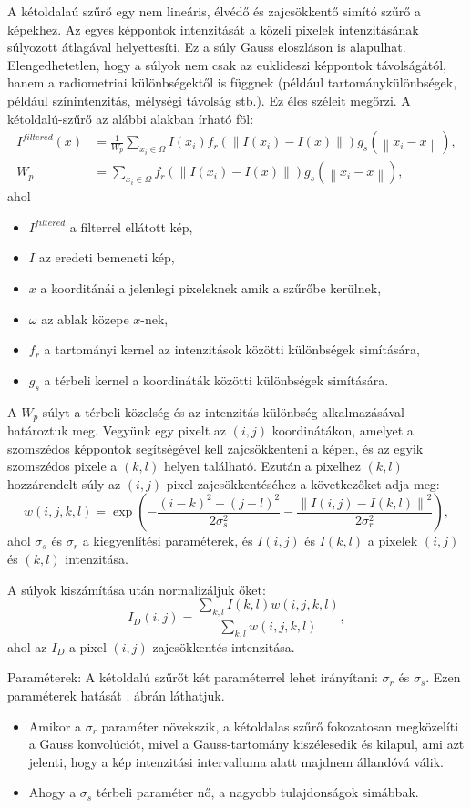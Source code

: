 
A kétoldalaú szűrő egy nem lineáris, élvédő és zajcsökkentő simító szűrő a képekhez. Az egyes képpontok intenzitását a közeli pixelek intenzitásának súlyozott átlagával helyettesíti. Ez a súly Gauss eloszláson is  alapulhat. Elengedhetetlen, hogy a súlyok nem csak az euklideszi képpontok távolságától, hanem a radiometriai különbségektől is függnek (például tartománykülönbségek, például színintenzitás, mélységi távolság stb.). Ez éles széleit megőrzi. A kétoldalú-szűrő az alábbi alakban írható föl:
\begin{align*}
I^{filtered}(x) &=
\frac{1}{W_p}\sum_{x_i\in\Omega}{I(x_i)f_r(\left \| I(x_i)-I(x) \right \|)g_s(\left \| x_i-x \right \|)}, \\
W_p &=
\sum_{x_i \in \Omega} f_r(\left \| I(x_i)-I(x) \right \|)g_s(\left \| x_i-x \right \|),
\end{align*}
ahol
\begin{itemize}
\item $I^{filtered}$ a filterrel ellátott kép,
\item $I$ az eredeti bemeneti kép,
\item $x$ a koorditánái a jelenlegi pixeleknek amik a szűrőbe kerülnek,
\item $\omega$ az ablak közepe $x$-nek,
\item $f_r$ a tartományi kernel az intenzitások közötti különbségek simítására,
\item $g_s$ a térbeli kernel a koordináták közötti különbségek simítására.
\end{itemize}
A $W_p$ súlyt a térbeli közelség és az intenzitás különbség alkalmazásával határoztuk meg. Vegyünk egy pixelt az $(i, j)$ koordinátákon, amelyet a szomszédos képpontok segítségével kell zajcsökkenteni a képen, és az egyik szomszédos pixele a $(k, l)$ helyen található. Ezután a pixelhez $(k, l)$ hozzárendelt súly az $(i, j)$ pixel zajcsökkentéséhez a következőket adja meg:
$$
w(i, j, k, l) =
\exp \left(
-\frac{(i-k)^{2}+(j-l)^{2}}{2\sigma_{s}^{2}}
-\frac{\left \| I(i,j)-I(k,l) \right \|^{2}}{2\sigma_{r}^{2}}
\right),
$$
ahol $\sigma_s$ és $\sigma_r$ a kiegyenlítési paraméterek, és $I(i, j)$ és $I(k, l)$ a pixelek $(i, j)$ és $(k, l)$ intenzitása.

A súlyok kiszámítása után normalizáljuk őket:
$$
I_{D}(i,j) =
\frac{\sum_{k,l}I(k,l)w(i, j, k, l)}{\sum_{k, l}w(i, j, k, l)},
$$
ahol az $I_D$ a pixel $(i, j)$ zajcsökkentés intenzitása.

Paraméterek: A kétoldalú szűrőt két paraméterrel lehet irányítani: $\sigma_r$ és $\sigma_s$. Ezen paraméterek hatását . ábrán láthatjuk.
\begin{itemize}
\item Amikor a $\sigma_r$ paraméter növekszik, a kétoldalas szűrő fokozatosan megközelíti a Gauss konvolúciót, mivel a Gauss-tartomány kiszélesedik és kilapul, ami azt jelenti, hogy a kép intenzitási intervalluma alatt majdnem állandóvá válik.
\item Ahogy a $\sigma_s$ térbeli paraméter nő, a nagyobb tulajdonságok simábbak.
\end{itemize}

